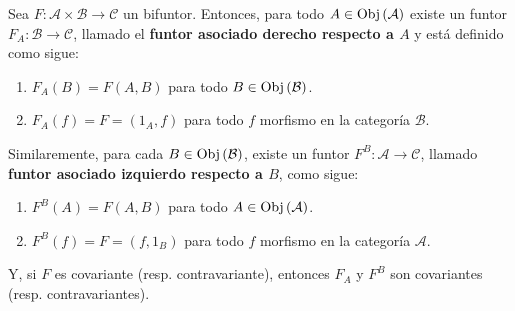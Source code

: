 \documentclass[12pt]{report}
\theoremstyle{largebreak}
\newcommand\cf[3]{\ensuremath{#1:#2\rightarrow#3}}
\newcommand{\Obj}[1]{\ensuremath{\textup{Obj}\left(#1\right)}}
\begin{document}
    \begin{propo}
        Sea $\cf{F}{\mathcal{A}\times\mathcal{B}}{\mathcal{C}}$ un bifuntor. Entonces, para todo $A\in\Obj{\mathcal{A}}$ existe un funtor $\cf{F_A}{\mathcal{B}}{\mathcal{C}}$, llamado el \textbf{funtor asociado derecho respecto a $A$} y está definido como sigue:
        \begin{enumerate}
            \item $F_A(B)=F(A,B)$ para todo $B\in\Obj{\mathcal{B}}$.
            \item $F_A(f)=F=(1_A,f)$ para todo $f$ morfismo en la categoría $\mathcal{B}$.
        \end{enumerate}
        Similaremente, para cada $B\in\Obj{\mathcal{B}}$, existe un funtor $\cf{F^B}{\mathcal{A}}{\mathcal{C}}$, llamado \textbf{funtor asociado izquierdo respecto a $B$}, como sigue:
        \begin{enumerate}
            \item $F^B(A)=F(A,B)$ para todo $A\in\Obj{\mathcal{A}}$.
            \item $F^B(f)=F=(f,1_B)$ para todo $f$ morfismo en la categoría $\mathcal{A}$.
        \end{enumerate}
        Y, si $F$ es covariante (resp. contravariante), entonces $F_A$ y $F^B$ son covariantes (resp. contravariantes). 
    \end{propo}
\end{document}
